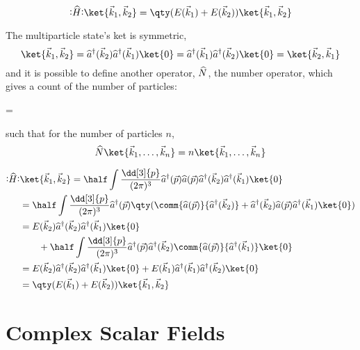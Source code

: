 \begin{equation}
  \label{eq:38}
  \nOp{H} \ket{\vec{k}_1, \vec{k}_2} = \qty( E(\vec{k}_1) + E(\vec{k}_2) ) \ket{\vec{k}_1, \vec{k}_2}
\end{equation}

The multiparticle state's ket is symmetric,
\[ \ket{\vec{k}_1, \vec{k}_2} = \hOp{a}(\vec{k}_2) \hOp{a}(\vec{k}_1) \ket{0} =  \hOp{a}(\vec{k}_1) \hOp{a}(\vec{k}_2) \ket{0} =  \ket{\vec{k}_2, \vec{k}_1} \]
and it is possible to define another operator, ${\widehat{N}}$, the number operator, which gives a count of the number of particles:
\begin{fequation}
  \label{eq:39}
   = \int {}  
\end{fequation}
such that for the number of particles $n$,
\[ \Op{N}  \ket{\vec{k}_1, \dots, \vec{k}_n} = n  \ket{\vec{k}_1, \dots, \vec{k}_n} \]

\begin{derivation}
\begin{align*}
  \nOp{H} & \ket{\vec{k}_1, \vec{k}_2} = \half \int \frac{\dd[3]{p}}{(2 \pi)^3} \hOp{a}(\vec{p}) \Op{a}(\vec{p}) \hOp{a}(\vec{k}_2) \hOp{a}(\vec{k}_1) \ket{0}  \\
&= \half \int \frac{\dd[3]{p}}{(2 \pi)^3} \hOp{a}(\vec{p}) \qty( \comm{\Op{a}(\vec{p})}{\hOp{a}(\vec{k}_2)} + \hOp{a}(\vec{k}_2) \Op{a}(\vec{p}) \hOp{a}(\vec{k}_1) \ket{0} ) \\
&= E(\vec{k}_2) \hOp{a}(\vec{k}_2) \hOp{a}(\vec{k}_1) \ket{0} \\ &\qquad+ \half \int \frac{\dd[3]{p}}{(2 \pi)^3} \hOp{a}(\vec{p}) \hOp{a}(\vec{k}_2)  \comm{\Op{a}(\vec{p})}{\hOp{a}(\vec{k}_1)} \ket{0} \\
&= E(\vec{k}_2) \hOp{a}(\vec{k}_2) \hOp{a}(\vec{k}_1) \ket{0} + E(\vec{k}_1) \hOp{a}(\vec{k}_1) \hOp{a}(\vec{k}_2) \ket{0} \\
&= \qty(E(\vec{k}_1) + E(\vec{k}_2) ) \ket{\vec{k}_1, \vec{k}_2}
\end{align*}
\end{derivation}

\section{Complex Scalar Fields}
\label{sec:complex-scalar-field}


